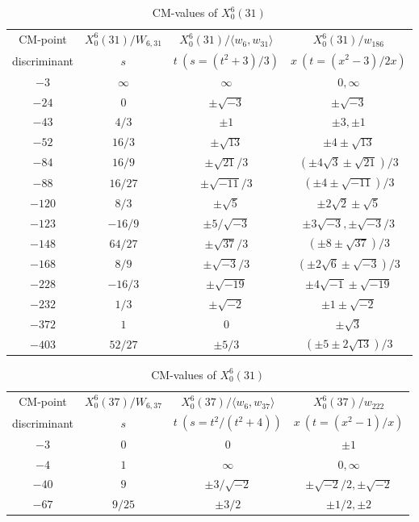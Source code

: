 \documentclass{amsart}
\theoremstyle{definition}
\begin{document}
\begin{appendices}
\renewcommand{\arraystretch}{1.5}
\tabcolsep=10pt                         
\begin{table}
\begin{tabular}{|c|c|c|c|}
\hline
CM-point& $X_{0}^{6}\left( 31\right) /W_{6,31}$ & $X_{0}^{6}\left( 31\right)/\langle w_6,w_{31} \rangle $ & $%
X_{0}^{6}\left( 31\right) /w_{186}$ \\
discriminant & $s$ & $t\ (s=(t^2+3)/{3})$ & $x\ (t=(x^2-3)/{2x})$ \\ \hline
${-3}$ & $\infty $ & $\infty $ & $0,\infty $ \\ 
${-24}$ & $0$ & $\pm \sqrt{-3}$ & $\pm \sqrt{-3}$ \\ 
${-43}$ & ${4}/{3}$ & $\pm 1$ & $\pm 3,\pm 1$ \\ 
${-52}$ & ${16}/{3}$ & $\pm \sqrt{13}$ & $\pm 4\pm \sqrt{13}$ \\ 
${-84}$ & ${16}/{9}$ & $\pm \sqrt{21}/{3}$ & $(\pm 4\sqrt{3}%
\pm \sqrt{21})/{3}$ \\ 
${-88}$ & ${16}/{27}$ & $\pm{ \sqrt{-11}}/{3}$ & $(\pm 4\pm 
\sqrt{-11})/{3}$ \\ 
${-120}$ & ${8}/{3}$ & $\pm \sqrt{5}$ & $\pm 2\sqrt{2}\pm \sqrt{5}$ \\ 

${-123}$ & $-{16}/{9}$ & $\pm {5/\sqrt{-3}}$ & $\pm 3\sqrt{-3}, \pm {\sqrt{-3}}/{3}$ \\ 
${-148}$ & ${64}/{27}$ & $\pm{ \sqrt{37}}/{3}$ & $(\pm 8\pm 
\sqrt{37})/{3}$ \\ 
${-168}$ & ${8}/{9}$ & $\pm{ \sqrt{-3}}/{3}$ & $(\pm 2\sqrt{6}%
\pm \sqrt{-3})/{3}$ \\ 
${-228}$ & $-{16}/{3}$ & $\pm \sqrt{-19}$ & $\pm 4\sqrt{-1}\pm \sqrt{-19}$ \\ 

${-232}$ & ${1}/{3}$ & $\pm \sqrt{-2}$ & $\pm 1\pm \sqrt{-2}$ \\ 
${-372}$ & $1$ & $0$ & $  \pm\sqrt{3} $ \\ 
${-403}$ & ${52}/{27}$ & $\pm{ 5}/{3}$ & $(\pm 5\pm 2\sqrt{13}%
)/{3}$ \\ \hline
\end{tabular}
\bigskip
\caption{CM-values of $X^{6}_0(31)$}


\renewcommand{\arraystretch}{1.5}
\tabcolsep=10pt                         
\begin{tabular}{|c|c|c|c|}
\hline
CM-point& $X_{0}^{6}\left( 37\right) /W_{6,37}$ & $X_{0}^{6}\left( 37\right)
/{\langle w_6,w_{37}\rangle}$ & $X_{0}^{6}\left( 37\right) /w_{222}$ \\
discriminant & $s$ & $t\ (s={t^2}/(t^2+4))$ & $x\ (t=(x^2-1)/{x})$ \\ \hline
${-3}$ & $0$ & $0$ & $\pm 1$ \\ 
${-4}$ & $1$ & $\infty $ & $0,\infty$ \\ 
${-40}$ & $9$ & $\pm{3/\sqrt{-2}}$ & $\pm{ \sqrt{-2}}/{2},\pm 
\sqrt{-2}$ \\ 
${-67}$ & ${9}/{25}$ & $\pm{ 3}/{2}$ & $\pm{ 1}/{2},\pm 2$ \\ 


\end{tabular}
\end{table}
\end{appendices}
\end{document}
